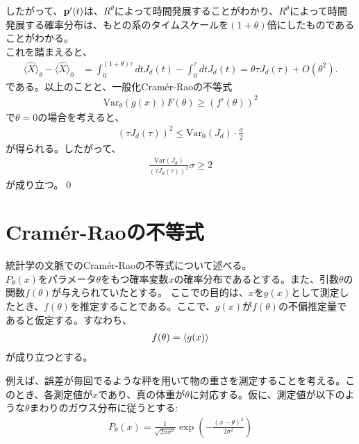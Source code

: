 \documentclass[a4paper,11pt]{jsarticle}
\numberwithin{equation}{section}
\begin{document}
したがって、$\vb{p}'(t)$は、$R^\theta$によって時間発展することがわかり、$R^\theta$によって時間発展する確率分布は、もとの系のタイムスケールを$(1+\theta)$倍にしたものであることがわかる。\\
これを踏まえると、
\begin{align}
    \langle \hat{X} \rangle_\theta - \langle \hat{X} \rangle_0 
    &= \int_0^{(1+\theta)\tau} dt J_d(t) - \int_0^\tau dt J_d(t) \nonumber =\theta \tau J_d(\tau) + O(\theta^2).
\end{align}
である。以上のことと、一般化Cram\'er-Raoの不等式
\begin{align}
    \text{Var}_{\theta}(g(x))F(\theta) \geq (f'(\theta))^2
\end{align}
で$\theta = 0$の場合を考えると、
\begin{align}
    (\tau J_d(\tau))^2 \leq \text{Var}_0(J_d) \cdot \frac{\sigma}{2}
\end{align}
が得られる。したがって、
\begin{align}
    \frac{\text{Var}(J_d)}{(\tau J_d(\tau))^2} \sigma \geq 2
\end{align}
が成り立つ。\qed


\section{Cram\'er-Raoの不等式}
統計学の文脈でのCram\'er-Raoの不等式について述べる。\\
$P_{\theta}(x)$をパラメータ$\theta$をもつ確率変数$x$の確率分布であるとする。また、引数$\theta$の関数$f(\theta)$が与えられていたとする。
ここでの目的は、$x$を$g(x)$として測定したとき、$f(\theta)$を推定することである。ここで、$g(x)$が$f(\theta)$の不偏推定量であると仮定する。すなわち、
\begin{align}
    f(\theta) = \ev{g(x)} 
\end{align}
が成り立つとする。

例えば、誤差が毎回でるような秤を用いて物の重さを測定することを考える。このとき、各測定値が$x$であり、真の体重が$\theta$に対応する。仮に、測定値が以下のような$\theta$まわりのガウス分布に従うとする:
\begin{align}
    P_{\theta}(x) = \frac{1}{\sqrt{2\pi \sigma^2}}\exp(-\frac{(x-\theta)^2}{2\sigma^2})
\end{align}
\end{document}
